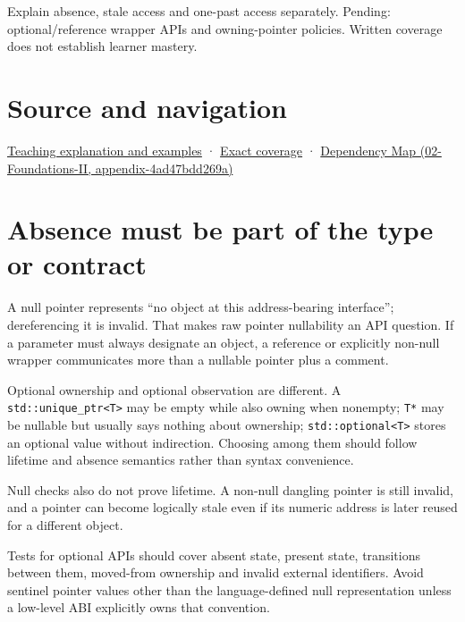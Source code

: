 Explain absence, stale access and one-past access separately. Pending: optional/reference wrapper APIs and owning-pointer policies. Written coverage does not establish learner mastery.

\section{Source and navigation}\label{appendix-afae48c31800-source-and-navigation}

\href{Continuous\%20Notes/Computing\%20Foundations\%20-\%20From\%20Bits\%20to\%20C++\%20and\%20Systems\%20APIs\#A\%20pointer\%20carries\%20an\%20access\%20contract}{Teaching explanation and examples} · \hyperref[appendix-fd090d982a15-m008---parts-113-126]{Exact coverage} · \href{../02-Foundations-II/main.pdf\#nameddest=appendix-4ad47bdd269a}{Dependency Map (02-Foundations-II, appendix-4ad47bdd269a)}

\section{Absence must be part of the type or contract}\label{appendix-afae48c31800-absence-must-be-part-of-the-type-or-contract}

A null pointer represents ``no object at this address-bearing interface''; dereferencing it is invalid. That makes raw pointer nullability an API question. If a parameter must always designate an object, a reference or explicitly non-null wrapper communicates more than a nullable pointer plus a comment.

Optional ownership and optional observation are different. A \texttt{std::unique\_ptr\textless{}T\textgreater{}} may be empty while also owning when nonempty; \texttt{T*} may be nullable but usually says nothing about ownership; \texttt{std::optional\textless{}T\textgreater{}} stores an optional value without indirection. Choosing among them should follow lifetime and absence semantics rather than syntax convenience.

Null checks also do not prove lifetime. A non-null dangling pointer is still invalid, and a pointer can become logically stale even if its numeric address is later reused for a different object.

Tests for optional APIs should cover absent state, present state, transitions between them, moved-from ownership and invalid external identifiers. Avoid sentinel pointer values other than the language-defined null representation unless a low-level ABI explicitly owns that convention.

